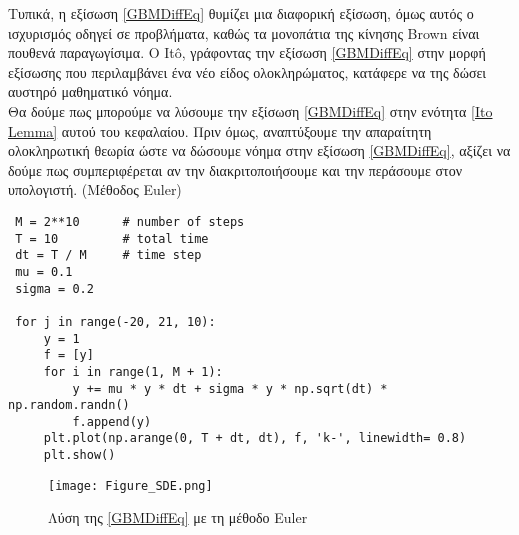 \documentclass[12pt,a4paper,twoside,openany]{book}
\begin{document}
	Τυπικά, η εξίσωση \eqref{GBMDiffEq} θυμίζει μια διαφορική εξίσωση, όμως αυτός ο ισχυρισμός οδηγεί σε προβλήματα, καθώς τα μονοπάτια της κίνησης Brown είναι πουθενά παραγωγίσιμα. Ο Itô, γράφοντας την εξίσωση \eqref{GBMDiffEq} στην μορφή εξίσωσης που περιλαμβάνει ένα νέο είδος ολοκληρώματος, κατάφερε να της δώσει αυστηρό μαθηματικό νόημα.
	\vspace{2.5mm}\\
 	Θα δούμε πως μπορούμε να λύσουμε την εξίσωση \eqref{GBMDiffEq} στην ενότητα \ref{Ito Lemma} αυτού του κεφαλαίου. Πριν όμως, αναπτύξουμε την απαραίτητη ολοκληρωτική θεωρία ώστε να δώσουμε νόημα στην εξίσωση \eqref{GBMDiffEq}, αξίζει να δούμε πως συμπεριφέρεται αν την διακριτοποιήσουμε και την περάσουμε στον υπολογιστή. (Μέθοδος Euler)
 	\vspace{4.5mm}
\begin{lstlisting}
 M = 2**10 		# number of steps
 T = 10			# total time
 dt = T / M		# time step
 mu = 0.1
 sigma = 0.2
 		
 for j in range(-20, 21, 10):
 	 y = 1
 	 f = [y]
     for i in range(1, M + 1):	
 		 y += mu * y * dt + sigma * y * np.sqrt(dt) * np.random.randn()
 		 f.append(y)
 	 plt.plot(np.arange(0, T + dt, dt), f, 'k-', linewidth= 0.8)
 	 plt.show()\end{lstlisting}
   
	\begin{figure}[h]
		\centering
		\texttt{[image: Figure\_SDE.png]}
		\caption{Λύση της \eqref{GBMDiffEq} με τη μέθοδο Euler}
		\label{fig:SDE}
	\end{figure}
   
   
 	
\end{document}
